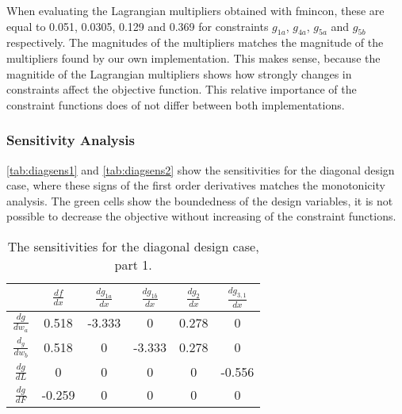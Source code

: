 When evaluating the Lagrangian multipliers obtained with fmincon, these are equal to 0.051, 0.0305, 0.129 and 0.369 for constraints $g_{1a}$, $g_{4a}$, $g_{5a}$ and $g_{5b}$ respectively. The magnitudes of the multipliers matches the magnitude of the multipliers found by our own implementation. This makes sense, because the magnitide of the Lagrangian multipliers shows how strongly changes in constraints affect the objective function. This relative importance of the constraint functions does of not differ between both implementations.

\subsubsection{Sensitivity Analysis}
\autoref{tab:diagsens1} and \ref{tab:diagsens2} show the sensitivities for the diagonal design case, where these signs of the first order derivatives matches the monotonicity analysis. The green cells show the boundedness of the design variables, it is not possible to decrease the objective without increasing of the constraint functions.

\begin{table}[H]
	\centering
	\begin{tabular}{|c|c|c|c|c|c|}
		\hline
		\textbf{}                    & \textbf{$\frac{d f }{d  x}$}   & \textbf{$\frac{d g_{1a}}{d  x}$} & \textbf{$\frac{d g_{1b}}{d  x}$} & \textbf{$\frac{d g_{2}}{d  x}$} & \textbf{$\frac{d g_{3,1}}{d  x}$} \\ \hline
		\textbf{$\frac{d g}{dw_a}$}  & \cellcolor[HTML]{9AFF99}0.518  & \cellcolor[HTML]{9AFF99}-3.333   & 0                                & 0.278                           & 0                                 \\ \hline
		\textbf{$\frac{d_g}{d w_b}$} & \cellcolor[HTML]{9AFF99}0.518  & 0                                & -3.333                           & 0.278                           & 0                                 \\ \hline
		\textbf{$\frac{d g}{d L}$}   & 0                              & 0                                & 0                                & 0                               & -0.556                            \\ \hline
		\textbf{$\frac{dg}{d F}$}    & \cellcolor[HTML]{9AFF99}-0.259 & 0                                & 0                                & 0                               & 0                                 \\ \hline
	\end{tabular}
	\caption{The sensitivities for the diagonal design case, part 1.}
	\label{tab:diagsens1}
\end{table}

